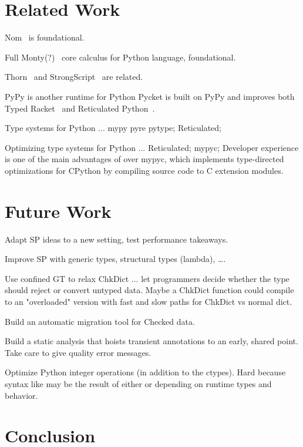 \documentclass[a4paper,english,cleveref,autoref,thm-restate,anonymous,]{lipics-v2021}
\begin{document}
\section{Related Work}
\label{s:related}

Nom~\cite{mt-oopsla-2017} is foundational.

Full Monty(?)~\cite{pmmwplck-oopsla-2013} core calculus for Python language, foundational.

Thorn~\cite{wnlov-popl-2010} and StrongScript~\cite{rzv-ecoop-2015} are related.

PyPy is another runtime for Python
Pycket is built on PyPy and improves both Typed Racket~\cite{bbst-oopsla-2017}
and Reticulated Python~\cite{vsc-dls-2019}.

Type systems for Python ...
mypy pyre pytype;
Reticulated;

Optimizing type systems for Python ...
Reticulated;
mypyc;
Developer experience is one of the main advantages of \SP{} over mypyc,
which implements type-directed optimizations for CPython
by compiling source code to C extension modules.



\section{Future Work}
\label{s:future}

Adapt SP ideas to a new setting, test performance takeaways.

Improve SP with generic types, structural types (lambda), \ldots.

Use confined GT to relax ChkDict ... let programmers decide whether
the type should reject or convert untyped data.
Maybe a ChkDict function could compile to an "overloaded" version with
fast and slow paths for ChkDict vs normal dict.

Build an automatic migration tool for Checked data.

Build a static analysis that hoists transient annotations to an early, shared point.
Take care to give quality error messages.

Optimize Python integer operations (in addition to the ctypes).
Hard because syntax like  may be the result of either 
or  depending on runtime types and behavior.


\section{Conclusion}
\label{s:conclusion}
\end{document}
